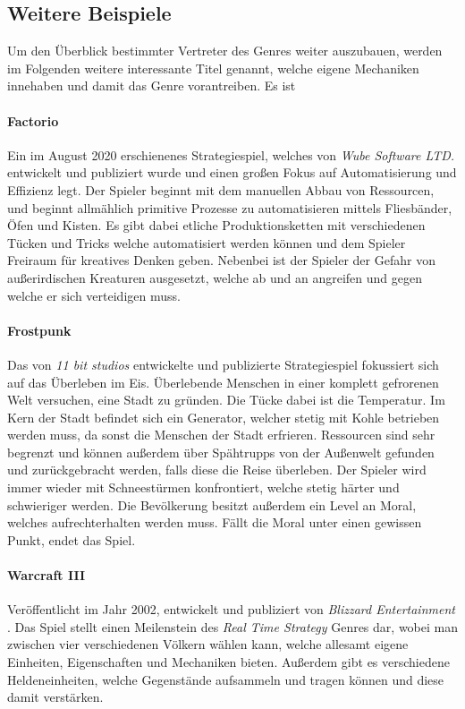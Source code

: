 \subsection{Weitere Beispiele}
Um den Überblick bestimmter Vertreter des Genres weiter auszubauen, werden im Folgenden weitere interessante Titel genannt, welche eigene Mechaniken innehaben und damit das Genre vorantreiben. Es ist 

\paragraph*{Factorio} Ein im August 2020 erschienenes Strategiespiel, welches von \textit{Wube Software LTD.} entwickelt und publiziert wurde \cite*[]{igdb:factorio} und einen großen Fokus auf Automatisierung und Effizienz legt. Der Spieler beginnt mit dem manuellen Abbau von Ressourcen, und beginnt allmählich primitive Prozesse zu automatisieren mittels Fliesbänder, Öfen und Kisten. Es gibt dabei etliche Produktionsketten mit verschiedenen Tücken und Tricks welche automatisiert werden können und dem Spieler Freiraum für kreatives Denken geben. Nebenbei ist der Spieler der Gefahr von außerirdischen Kreaturen ausgesetzt, welche ab und an angreifen und gegen welche er sich verteidigen muss.

\paragraph*{Frostpunk} Das von \textit{11 bit studios} entwickelte und publizierte Strategiespiel \cite*[]{igdb:frostpunk} fokussiert sich auf das Überleben im Eis. Überlebende Menschen in einer komplett gefrorenen Welt versuchen, eine Stadt zu gründen. Die Tücke dabei ist die Temperatur. Im Kern der Stadt befindet sich ein Generator, welcher stetig mit Kohle betrieben werden muss, da sonst die Menschen der Stadt erfrieren. Ressourcen sind sehr begrenzt und können außerdem über Spähtrupps von der Außenwelt gefunden und zurückgebracht werden, falls diese die Reise überleben. Der Spieler wird immer wieder mit Schneestürmen konfrontiert, welche stetig härter und schwieriger werden. Die Bevölkerung besitzt außerdem ein Level an Moral, welches aufrechterhalten werden muss. Fällt die Moral unter einen gewissen Punkt, endet das Spiel.

\paragraph*{Warcraft III} Veröffentlicht im Jahr 2002, entwickelt und publiziert von \textit{Blizzard Entertainment} \cite*[]{igdb:warcraft}. Das Spiel stellt einen Meilenstein des \textit{Real Time Strategy} Genres dar, wobei man zwischen vier verschiedenen Völkern wählen kann, welche allesamt eigene Einheiten, Eigenschaften und Mechaniken bieten. Außerdem gibt es verschiedene Heldeneinheiten, welche Gegenstände aufsammeln und tragen können und diese damit verstärken.

